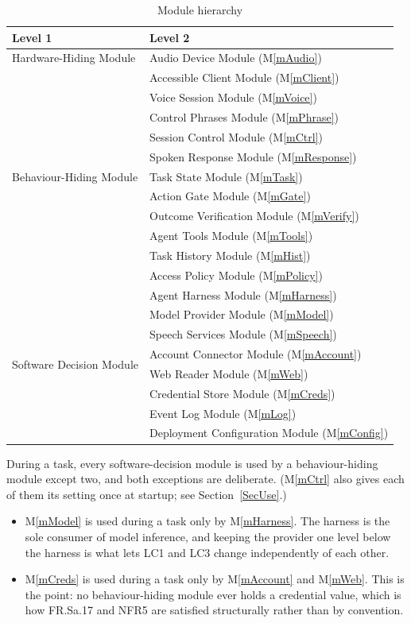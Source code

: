 \documentclass[12pt, titlepage]{article}
\newcommand{\mref}[1]{M\ref{#1}}
\begin{document}
\begin{table}[H]
\centering
\begin{tabular}{p{} p{}}
\toprule
\textbf{Level 1} & \textbf{Level 2}\\
\midrule
Hardware-Hiding Module & Audio Device Module (\mref{mAudio})\\
\midrule
\multirow{11}{*}{Behaviour-Hiding Module}
& Accessible Client Module (\mref{mClient})\\
& Voice Session Module (\mref{mVoice})\\
& Control Phrases Module (\mref{mPhrase})\\
& Session Control Module (\mref{mCtrl})\\
& Spoken Response Module (\mref{mResponse})\\
& Task State Module (\mref{mTask})\\
& Action Gate Module (\mref{mGate})\\
& Outcome Verification Module (\mref{mVerify})\\
& Agent Tools Module (\mref{mTools})\\
& Task History Module (\mref{mHist})\\
& Access Policy Module (\mref{mPolicy})\\
\midrule
\multirow{8}{*}{Software Decision Module}
& Agent Harness Module (\mref{mHarness})\\
& Model Provider Module (\mref{mModel})\\
& Speech Services Module (\mref{mSpeech})\\
& Account Connector Module (\mref{mAccount})\\
& Web Reader Module (\mref{mWeb})\\
& Credential Store Module (\mref{mCreds})\\
& Event Log Module (\mref{mLog})\\
& Deployment Configuration Module (\mref{mConfig})\\
\bottomrule
\end{tabular}
\caption{Module hierarchy}
\label{TblMH}
\end{table}

During a task, every software-decision module is used by a behaviour-hiding
module except two, and both exceptions are deliberate. (\mref{mCtrl} also gives
each of them its setting once at startup; see Section~\ref{SecUse}.)

\begin{itemize}
\item \mref{mModel} is used during a task only by \mref{mHarness}. The harness is the sole
consumer of model inference, and keeping the provider one level below the harness
is what lets LC1 and LC3 change independently of each other.
\item \mref{mCreds} is used during a task only by \mref{mAccount} and
\mref{mWeb}. This is the
point: no behaviour-hiding module ever holds a credential value, which is how
FR.Sa.17 and NFR5 are satisfied structurally rather than by convention.
\end{itemize}
\end{document}
